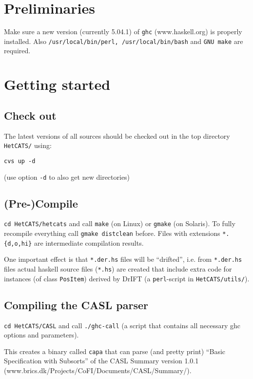 \documentclass{article}
\begin{document}
\section{Preliminaries}

Make sure a new version (currently 5.04.1) of \texttt{ghc}
(www.haskell.org) is properly installed.  Also
\texttt{/usr/local/bin/perl, /usr/local/bin/bash} and \texttt{GNU
  make} are required.

\section{Getting started}

\subsection{Check out}
The latest versions of all sources should be checked out in the top
directory \texttt{HetCATS/} using:

\texttt{cvs up -d}

(use option \texttt{-d} to also get new directories)

\subsection{(Pre-)Compile}

\texttt{cd HetCATS/hetcats} and call \texttt{make} (on Linux) or
\texttt{gmake} (on Solaris). To fully recompile everything call
\texttt{gmake distclean} before. Files with extensions
\texttt{*.\{d,o,hi\}} are intermediate compilation results.

One important effect is that \texttt{*.der.hs} files will be
``drifted'', i.e.  from \texttt{*.der.hs} files actual haskell source
files (\texttt{*.hs}) are created that include extra code for
instances (of class \texttt{PosItem}) derived by DrIFT (a
\texttt{perl}-script in \texttt{HetCATS/utils/}).

\subsection{Compiling the CASL parser}

\texttt{cd HetCATS/CASL} and call \texttt{./ghc-call} (a script that
contains all necessary ghc options and parameters).

This creates a binary called \texttt{capa} that can parse (and pretty
print) ``Basic Specification with Subsorts'' of the CASL Summary
version 1.0.1 \\ (www.brics.dk/Projects/CoFI/Documents/CASL/Summary/).
\end{document}
